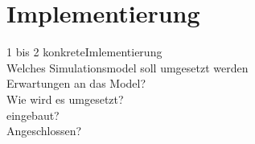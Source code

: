 \newpage 
\thispagestyle{empty}
\section{Implementierung}\label{sec:Implementierung}
1 bis 2 konkreteImlementierung\\
Welches Simulationsmodel soll umgesetzt werden\\
Erwartungen an das Model?\\
Wie wird es umgesetzt?\\
eingebaut?\\
Angeschlossen?\\



